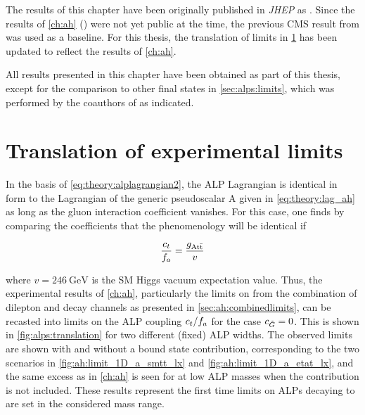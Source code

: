 \enlargethispage{\baselineskip}

The results of this chapter have been originally published in \textit{JHEP} as . Since the results of \cref{ch:ah} () were not yet public at the time, the previous CMS result from  was used as a baseline. For this thesis, the translation of limits in \cref{sec:alps:translation} has been updated to reflect the results of \cref{ch:ah}.

All results presented in this chapter have been obtained as part of this thesis, except for the comparison to other final states in \cref{sec:alps:limits}, which was performed by the coauthors of  as indicated.


\section{Translation of experimental limits}
\label{sec:alps:translation}

In the basis of \cref{eq:theory:alplagrangian2}, the ALP Lagrangian is identical in form to the Lagrangian of the generic pseudoscalar A given in \cref{eq:theory:lag_ah} as long as the gluon interaction coefficient \cG vanishes. For this case, one finds by comparing the coefficients that the phenomenology will be identical if

\begin{equation}
    \frac{c_t}{f_a} = \frac{g_{\mathrm{A t \bar{t}}}}{v}
\end{equation}

\noindent where $v=\SI{246}{\GeV}$ is the SM Higgs vacuum expectation value. Thus, the experimental results of \cref{ch:ah}, particularly the limits on \gAtt from the combination of dilepton and \ljets decay channels as presented in \cref{sec:ah:combinedlimits}, can be recasted into limits on the ALP coupling $c_t/f_a$ for the case $c_{\tilde{G}} = 0$. This is shown in \cref{fig:alps:translation} for two different (fixed) ALP widths.
The observed limits are shown with and without a \ttbar bound state contribution, corresponding to the two scenarios in \cref{fig:ah:limit_1D_a_smtt_lx} and \cref{fig:ah:limit_1D_a_etat_lx}, and the same excess as in \cref{ch:ah} is seen for at low ALP masses when the \etat contribution is not included. These results represent the first time limits on ALPs decaying to \ttbar are set in the considered mass range.

